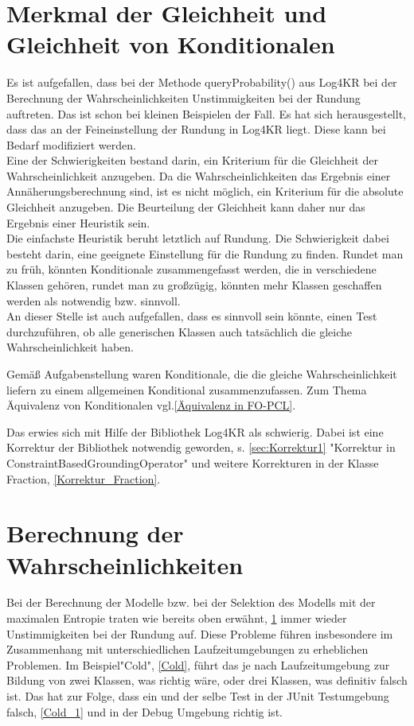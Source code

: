 \documentclass[a4paper, 11pt]{book}
\begin{document}
{\section{Merkmal der Gleichheit und Gleichheit von Konditionalen} \label{Gleichheit}
Es ist aufgefallen, dass bei der Methode queryProbability() aus Log4KR bei der Berechnung der Wahrscheinlichkeiten Unstimmigkeiten bei der Rundung auftreten. Das ist schon bei kleinen Beispielen der Fall. Es hat sich herausgestellt, dass das an der Feineinstellung der Rundung in Log4KR liegt. Diese kann bei Bedarf modifiziert werden.\\
Eine der Schwierigkeiten bestand darin, ein Kriterium für die Gleichheit der Wahrscheinlichkeit anzugeben. Da die Wahrscheinlichkeiten das Ergebnis einer Annäherungsberechnung sind, ist es nicht möglich, ein Kriterium für die absolute Gleichheit anzugeben. Die Beurteilung der Gleichheit kann daher nur das Ergebnis einer Heuristik sein.\\
Die einfachste Heuristik beruht letztlich auf Rundung. Die Schwierigkeit dabei besteht darin, eine geeignete Einstellung für die Rundung zu finden. Rundet man zu früh, könnten Konditionale zusammengefasst werden, die in verschiedene Klassen gehören, rundet man zu großzügig, könnten mehr Klassen geschaffen werden als notwendig bzw. sinnvoll.\\
An dieser Stelle ist auch aufgefallen, dass es sinnvoll sein könnte, einen Test durchzuführen, ob alle generischen Klassen auch tatsächlich die gleiche Wahrscheinlichkeit haben. 

Gemäß Aufgabenstellung waren Konditionale, die die gleiche Wahrscheinlichkeit liefern zu einem allgemeinen Konditional zusammenzufassen. Zum Thema Äquivalenz von Konditionalen vgl.\ref{Äquivalenz in FO-PCL}.

Das erwies sich mit Hilfe der Bibliothek Log4KR als schwierig. Dabei ist eine Korrektur der Bibliothek notwendig geworden, s. \ref{sec:Korrektur1} "{}Korrektur in ConstraintBasedGroundingOperator"{} und weitere Korrekturen in der Klasse Fraction, \ref{Korrektur_Fraction}.



\section{Berechnung der Wahrscheinlichkeiten} \label{Berechnung_Wahrscheinlichkeiten}
Bei der Berechnung der Modelle bzw. bei der Selektion des Modells mit der maximalen Entropie traten wie bereits oben erwähnt, \ref{Gleichheit} immer wieder Unstimmigkeiten bei der Rundung auf. Diese Probleme führen insbesondere im Zusammenhang mit unterschiedlichen Laufzeitumgebungen zu erheblichen Problemen. Im Beispiel"{}Cold"{}, \ref{Cold}, führt das je nach Laufzeitumgebung zur Bildung von zwei Klassen, was richtig wäre, oder drei Klassen, was definitiv falsch ist. Das hat zur Folge, dass ein und der selbe Test in der JUnit Testumgebung falsch, \ref{Cold_1} und in der Debug Umgebung richtig ist.

}
\end{document}
